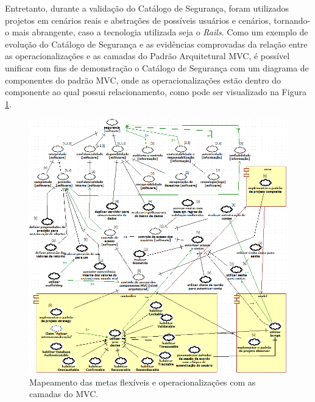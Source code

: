 Entretanto, durante a validação do Catálogo de Segurança, foram utilizados projetos em cenários reais e abstrações de possíveis usuários e cenários, tornando-o mais abrangente, caso a tecnologia utilizada seja o \textit{Rails}. Como um exemplo de evolução do Catálogo de Segurança e as evidências comprovadas da relação entre as operacionalizações e as camadas do Padrão Arquitetural MVC, é possível unificar com fins de demonstração o Catálogo de Segurança com um diagrama de componentes do padrão MVC, onde as operacionalizações estão dentro do componente ao qual possui relacionamento, como pode ser visualizado na Figura \ref{catalogoMapeado}. 

\begin{figure}[h!]
	\centering
	\includegraphics[keepaspectratio=true,scale=0.7]{figuras/catalogoMapeado.PNG}
	\caption{Mapeamento das metas flexíveis e operacionalizações com as camadas do MVC.}
	\label{catalogoMapeado}
\end{figure}

